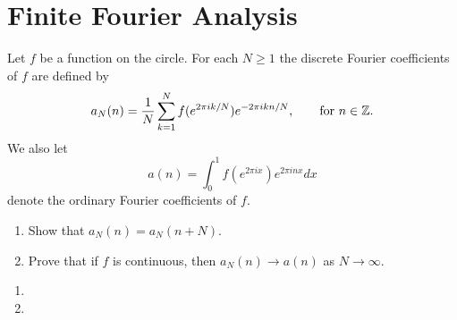 \chapter{Finite Fourier Analysis}

\begin{exercise}
    Let $f$ be a function on the circle. For each $N \geq 1$ the discrete Fourier coefficients of $f$ are defined by
    $$a_N(n) = \frac{1}{N}\sum_{k=1}^{N}f(e^{2\pi i k / N})e^{-2\pi i k n / N}, \qquad \text{for } n \in \mathbb{Z}. $$
    We also let
    $$a(n) = \int_{0}^{1}f(e^{2\pi i x})e^{2\pi i nx}dx$$
    denote the ordinary Fourier coefficients of $f$.
    \begin{enumerate}[label=(\alph*)]
        \item Show that $a_N(n) = a_N(n+N)$.
        \item Prove that if $f$ is continuous, then $a_N(n) \rightarrow a(n)$ as $N \rightarrow \infty$.\\
    \end{enumerate}
\end{exercise}

\begin{solution}
    \begin{enumerate}[label=(\alph*)]
        \item \td 
        \item \td 
    \end{enumerate}
\end{solution}